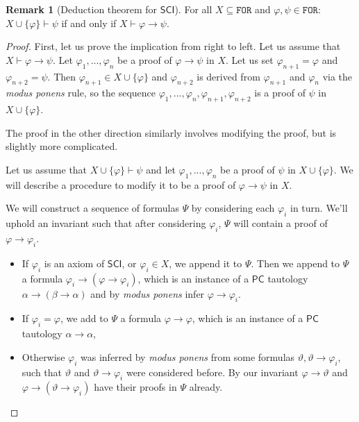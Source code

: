 \documentclass{article}
\theoremstyle{definition}
\theoremstyle{definition}
\theoremstyle{definition}
\newtheorem{remark}{Remark}[section]
\newcommand*{\ra}{\rightarrow}
\newcommand*{\FOR}{\texttt{FOR}}
\newcommand{\SCI}{$\mathsf{SCI}$\xspace}
\newcommand{\PC}{$\mathsf{PC}$\xspace}
\begin{document}
\begin{remark}[Deduction theorem for \SCI]
    For all $X \subseteq \FOR$ and $\varphi, \psi \in \FOR$: $X \cup \{\varphi\} \vdash \psi$ if and only if $X \vdash \varphi \ra \psi$.
    \begin{proof}
        First, let us prove the implication from right to left. Let us assume that $X \vdash \varphi \ra \psi$. Let $\varphi_1, ..., \varphi_n$ be a proof of $\varphi \ra \psi$ in $X$. Let us set $\varphi_{n+1} = \varphi$ and $\varphi_{n+2} = \psi$. Then $\varphi_{n+1} \in X \cup \{\varphi\}$ and $\varphi_{n+2}$ is derived from $\varphi_{n+1}$ and $\varphi_{n}$ via the \emph{modus ponens} rule, so the sequence $\varphi_1, ..., \varphi_n, \varphi_{n+1}, \varphi_{n+2}$ is a proof of $\psi$ in $X \cup \{\varphi\}$.

        The proof in the other direction similarly involves modifying the proof, but is
        slightly more complicated.

        Let us assume that $X \cup \{\varphi\} \vdash \psi$ and let $\varphi_1, ...,
            \varphi_n$ be a proof of $\psi$ in $X \cup \{\varphi\}$. We will describe a
        procedure to modify it to be a proof of $\varphi \ra \psi$ in $X$.

        We will construct a sequence of formulas $\Psi$ by considering each $\varphi_i$
        in turn. We'll uphold an invariant such that after considering $\varphi_i$,
        $\Psi$ will contain a proof of $\varphi \ra \varphi_i$.

        \begin{itemize}
            \item If $\varphi_i$ is an axiom of \SCI, or $\varphi_i \in X$, we append it to
                  $\Psi$. Then we append to $\Psi$ a formula $\varphi_i \ra (\varphi \ra
                      \varphi_i)$, which is an instance of a \PC tautology $\alpha \ra (\beta \ra
                      \alpha)$ and by \emph{modus ponens} infer $\varphi \ra \varphi_i$.
            \item If $\varphi_i = \varphi$, we add to $\Psi$ a formula $\varphi \ra \varphi$,
                  which is an instance of a \PC tautology $\alpha \ra \alpha$,
            \item Otherwise $\varphi_i$ was inferred by \emph{modus ponens} from some formulas
                  $\vartheta, \vartheta \ra \varphi_i$, such that $\vartheta$ and $\vartheta \ra
                      \varphi_i$ were considered before. By our invariant $\varphi \ra \vartheta$ and
                  $\varphi \ra (\vartheta \ra \varphi_i)$ have their proofs in $\Psi$ already.


\end{itemize}
\end{proof}
\end{remark}
\end{document}
